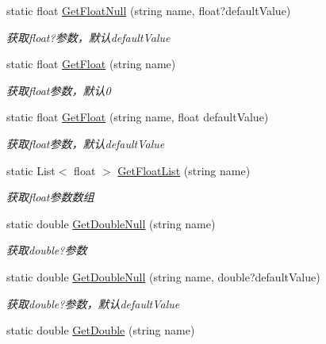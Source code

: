 \begin{DoxyCompactItemize}
static float \hyperlink{class_x_c_l_net_tools_1_1_string_hander_1_1_form_helper_a4647a1a2655436ed24cc07f117109818}{Get\-Float\-Null} (string name, float?default\-Value)
\begin{DoxyCompactList}\small\item\em 获取float?参数，默认default\-Value \end{DoxyCompactList}\item 
static float \hyperlink{class_x_c_l_net_tools_1_1_string_hander_1_1_form_helper_a0807fb3fcdf5a5686fe0d8417013835a}{Get\-Float} (string name)
\begin{DoxyCompactList}\small\item\em 获取float参数，默认0 \end{DoxyCompactList}\item 
static float \hyperlink{class_x_c_l_net_tools_1_1_string_hander_1_1_form_helper_acae860acd22e9f85511ccdc60c071c5c}{Get\-Float} (string name, float default\-Value)
\begin{DoxyCompactList}\small\item\em 获取float参数，默认default\-Value \end{DoxyCompactList}\item 
static List$<$ float $>$ \hyperlink{class_x_c_l_net_tools_1_1_string_hander_1_1_form_helper_ad405fffedfe8e34e61e4118754f99fe4}{Get\-Float\-List} (string name)
\begin{DoxyCompactList}\small\item\em 获取float参数数组 \end{DoxyCompactList}\item 
static double \hyperlink{class_x_c_l_net_tools_1_1_string_hander_1_1_form_helper_ac19469f1fde9f3cbdadb0481dd5bb67d}{Get\-Double\-Null} (string name)
\begin{DoxyCompactList}\small\item\em 获取double?参数 \end{DoxyCompactList}\item 
static double \hyperlink{class_x_c_l_net_tools_1_1_string_hander_1_1_form_helper_a032f11ed043dbf824356f28a2fdcebc7}{Get\-Double\-Null} (string name, double?default\-Value)
\begin{DoxyCompactList}\small\item\em 获取double?参数，默认default\-Value \end{DoxyCompactList}\item 
static double \hyperlink{class_x_c_l_net_tools_1_1_string_hander_1_1_form_helper_a5ce38e7b532cf3daf4a3d564034f78ec}{Get\-Double} (string name)

\end{DoxyCompactItemize}
